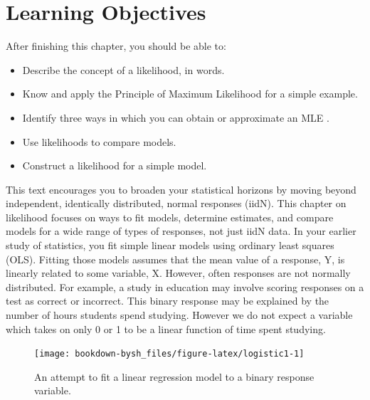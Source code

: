 \documentclass[
]{krantz}
\providecommand{\tightlist}{%
  \setlength{\itemsep}{0pt}\setlength{\parskip}{0pt}}
\begin{document}
\hypertarget{learning-objectives-1}{%
\section{Learning Objectives}\label{learning-objectives-1}}

After finishing this chapter, you should be able to:

\begin{itemize}
\tightlist
\item
  Describe the concept of a likelihood, in words.
\item
  Know and apply the Principle of Maximum Likelihood for a simple example.
\item
  Identify three ways in which you can obtain or approximate an MLE .
\item
  Use likelihoods to compare models.
\item
  Construct a likelihood for a simple model.
\end{itemize}

This text encourages you to broaden your statistical horizons by moving beyond independent, identically distributed, normal responses (iidN). This chapter on likelihood focuses on ways to fit models, determine estimates, and compare models for a wide range of types of responses, not just iidN data. In your earlier study of statistics, you fit simple linear models using ordinary least squares (OLS). Fitting those models assumes that the mean value of a response, Y, is linearly related to some variable, X. However, often responses are not normally distributed. For example, a study in education may involve scoring responses on a test as correct or incorrect. This binary response may be explained by the number of hours students spend studying. However we do not expect a variable which takes on only 0 or 1 to be a linear function of time spent studying.

\begin{figure}

{\centering \texttt{[image: bookdown-bysh\_files/figure-latex/logistic1-1]} 

}

\caption{An attempt to fit a linear regression model to a binary response variable.}\label{fig:logistic1}
\end{figure}
\end{document}
